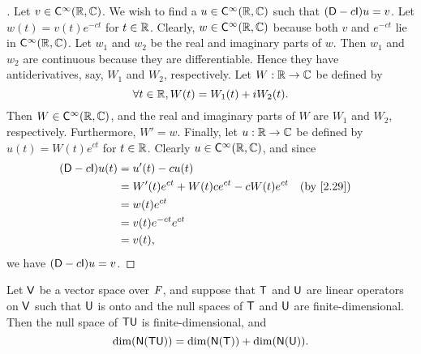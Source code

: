 \begin{proof}[]
  Let \(v \in \cfs[\infty](\R, \C)\).
  We wish to find a \(u \in \cfs[\infty](\R, \C)\) such that \((\Dop - c \IT) u = v\).
  Let \(w(t) = v(t) e^{-ct}\) for \(t \in \mathbb{R}\).
  Clearly, \(w \in \cfs[\infty](\R, \C)\) because both \(v\) and \(e^{-ct}\) lie in \(\cfs[\infty](\R, \C)\).
  Let \(w_1\) and \(w_2\) be the real and imaginary parts of \(w\).
  Then \(w_1\) and \(w_2\) are continuous because they are differentiable.
  Hence they have antiderivatives, say, \(W_1\) and \(W_2\), respectively.
  Let \(W : \mathbb{R} \to \mathbb{C}\) be defined by
  \[
    \forall t \in \mathbb{R}, W(t) = W_1(t) + i W_2(t).
  \]
  Then \(W \in \cfs[\infty](\R, \C)\), and the real and imaginary parts of \(W\) are \(W_1\) and \(W_2\), respectively.
  Furthermore, \(W' = w\).
  Finally, let \(u : \mathbb{R} \to \mathbb{C}\) be defined by \(u(t) = W(t) e^{ct}\) for \(t \in \mathbb{R}\).
  Clearly \(u \in \cfs[\infty](\R, \C)\), and since
  \begin{align*}
    (\Dop - c \IT) u(t) & = u'(t) - cu(t)                                                             \\
                        & = W'(t) e^{ct} + W(t) c e^{ct} - c W(t) e^{ct} &  & \text{(by \cref{2.29})} \\
                        & = w(t) e^{ct}                                                               \\
                        & = v(t) e^{-ct} e^{ct}                                                       \\
                        & = v(t),
  \end{align*}
  we have \((\Dop - c \IT) u = v\).
\end{proof}

\begin{lem}\label{2.7.12}
  Let \(\mathsf{V}\) be a vector space over \(\mathit{F}\), and suppose that \(\mathsf{T}\) and \(\mathsf{U}\) are linear operators on \(\mathsf{V}\) such that \(\mathsf{U}\) is onto and the null spaces of \(\mathsf{T}\) and \(\mathsf{U}\) are finite-dimensional.
  Then the null space of \(\mathsf{T} \mathsf{U}\) is finite-dimensional, and
  \[
    \dim(\ns{\T \U}) = \dim(\ns{\T}) + \dim(\ns{\U}).
  \]
\end{lem}

